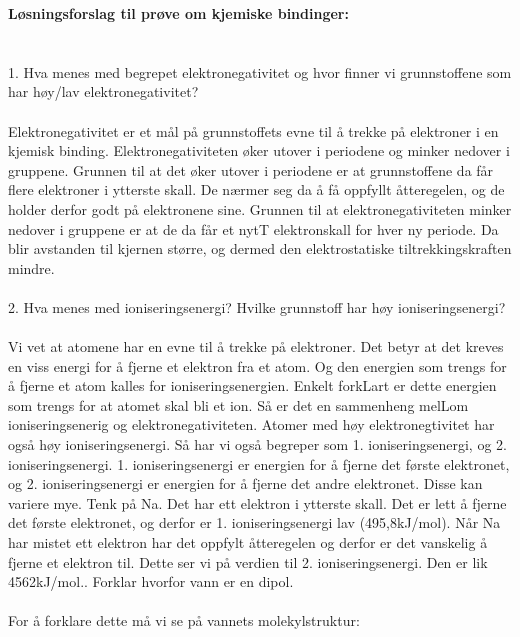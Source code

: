 \documentclass[12pt,a4paper]{article}
\author{Svein-Tore Narvestad}
\date{September 2025}
\begin{document}
\textbf{\large{Løsningsforslag til prøve om kjemiske bindinger:}}\\\\\\
1.	Hva menes med begrepet elektronegativitet og hvor finner vi grunnstoffene som har høy/lav elektronegativitet?\\\\
Elektronegativitet er et mål på grunnstoffets evne til å trekke på elektroner i en kjemisk binding.  Elektronegativiteten øker utover i periodene og minker nedover i gruppene.  Grunnen til at det øker utover i periodene er at grunnstoffene da får flere elektroner i ytterste skall.  De nærmer seg da å få oppfyllt åtteregelen, og de holder derfor godt på elektronene sine.  Grunnen til at elektronegativiteten minker nedover i gruppene er at de da får et nytT elektronskall for hver ny periode.  Da blir avstanden til kjernen større, og dermed den elektrostatiske tiltrekkingskraften mindre.\\\\
2.	Hva menes med ioniseringsenergi? Hvilke grunnstoff har høy ioniseringsenergi?\\\\
Vi vet at atomene har en evne til å trekke på elektroner.  Det betyr at det  kreves en viss energi for å fjerne et elektron fra et atom. Og den energien som trengs for å fjerne et atom kalles for ioniseringsenergien.  Enkelt forkLart er dette energien som trengs for at atomet skal bli et ion.  Så er det en sammenheng melLom ioniseringsenerig og elektronegativiteten.  Atomer med høy elektronegtivitet har også høy ioniseringsenergi.  Så har vi også begreper som  1. ioniseringsenergi, og 2. ioniseringsenergi.  1. ioniseringsenergi er energien for å fjerne det første elektronet, og 2. ioniseringsenergi er energien for å fjerne det andre elektronet.  Disse kan variere mye.  Tenk på Na.  Det har ett elektron i ytterste skall. Det er lett å fjerne det første elektronet, og derfor er 1. ioniseringsenergi lav (495,8kJ/mol). Når Na har mistet ett elektron har det oppfylt åtteregelen og derfor er det vanskelig å fjerne et elektron til. Dette ser vi på verdien til 2. ioniseringsenergi.  Den er lik 4562kJ/mol.. Forklar hvorfor vann er en dipol.\\\\
For å forklare dette må vi se på vannets molekylstruktur:\\\\
\begin{center}
\end{center}\vspace{1cm}
\end{document}
